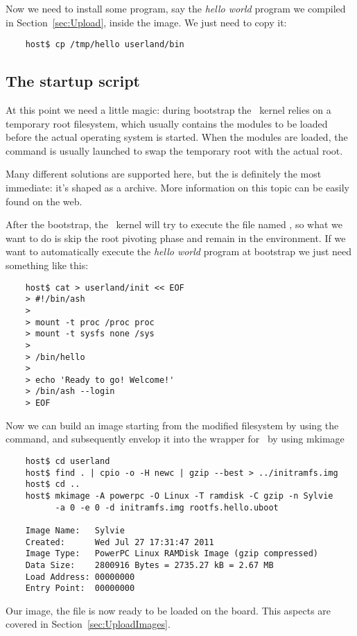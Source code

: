     Now we need to install some program, say the \emph{hello world}
    program we compiled in Section~\ref{sec:Upload}, inside the image. We
    just need to copy it:

\begin{lstlisting}
    host$ cp /tmp/hello userland/bin
\end{lstlisting}

\subsection{The startup script}

    At this point we need a little magic: during bootstrap the \Linux\
    kernel relies on a temporary root filesystem, which usually contains
    the modules to be loaded before the actual operating system is
    started.
    When the modules are loaded, the  command is
    usually launched
    to swap the temporary root with the actual root.

    Many different solutions are supported here, but the
     is definitely the most immediate: it's
    shaped as a  archive. More information on this
    topic can be easily found on the web.

    After the bootstrap, the \Linux\ kernel will try to execute the file
    named \FileName{/init}, so what we want to do is skip the root
    pivoting phase and remain in the \StdName{initramfs} environment. If
    we want
    to automatically execute the \emph{hello world} program at bootstrap
    we just need something like this:

\begin{lstlisting}
    host$ cat > userland/init << EOF
    > #!/bin/ash
    >
    > mount -t proc /proc proc
    > mount -t sysfs none /sys
    >
    > /bin/hello
    >
    > echo 'Ready to go! Welcome!'
    > /bin/ash --login
    > EOF
\end{lstlisting}

    Now we can build an  image starting from the
    modified filesystem by using the \Command{cpio} command, and
    subsequently envelop it into the wrapper for \uBoot\ by using mkimage

\begin{lstlisting}
    host$ cd userland
    host$ find . | cpio -o -H newc | gzip --best > ../initramfs.img
    host$ cd ..
    host$ mkimage -A powerpc -O Linux -T ramdisk -C gzip -n Sylvie
          -a 0 -e 0 -d initramfs.img rootfs.hello.uboot

    Image Name:   Sylvie
    Created:      Wed Jul 27 17:31:47 2011
    Image Type:   PowerPC Linux RAMDisk Image (gzip compressed)
    Data Size:    2800916 Bytes = 2735.27 kB = 2.67 MB
    Load Address: 00000000
    Entry Point:  00000000
\end{lstlisting}

    Our image, the file  is now ready to be
    loaded on the board. This aspects are covered in
    Section~\ref{sec:UploadImages}.

